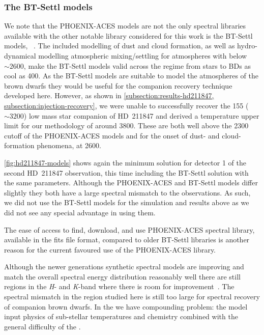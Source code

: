 \subsubsection{The {BT-Settl} models}
\label{subsubsec:bt-settl}
We note that the {PHOENIX-ACES} models are not the only spectral libraries available with the other notable library considered for this work is the {BT-Settl} models, ~\citep{allard_model_2010,allard_btsettl_2013,baraffe_new_2015}.
The included modelling of dust and cloud formation, as well as hydro-dynamical modelling atmospheric mixing/settling for atmospheres with \Teff{} below \(\sim2600\)\K{}, make the {BT-Settl} models valid across the regime from stars to {BD}s as cool as 400\K{}.
As the {BT-Settl} models are suitable to model the atmospheres of the brown dwarfs they would be useful for the companion recovery technique developed here.
However, as shown in \cref{subsection:results-hd211847, subsection:injection-recovery}, we were unable to successfully recover the 155\Mjup{} (\Teff{}\(\sim3200\)\K{}) low mass star companion of {HD~211847} and derived a temperature upper limit for our methodology of around 3800\K{}.
These are both well above the 2300\K{} cutoff of the {PHOENIX-ACES} models and for the onset of dust- and cloud-formation phenomena, at 2600\K{}.

\cref{fig:hd211847-models} shows again the minimum \textchisquared{} solution for detector 1 of the second {HD~211847} observation, this time including the {BT-Settl} solution with the same parameters.
Although the {PHOENIX-ACES} and {BT-Settl} models differ slightly they both have a large spectral mismatch to the observations.
As such, we did not use the {BT-Settl} models for the simulation and results above as we did not see any special advantage in using them.

The ease of access to find, download, and use {PHOENIX-ACES} spectral library, available in the fits file format, compared to older {BT-Settl} libraries is another reason for the current favoured use of the {PHOENIX-ACES} library.

Although the newer generations synthetic spectral models are improving and match the overall spectral energy distribution reasonably well there are still regions in the \emph{H}- and \emph{K}-band where there is room for improvement~\citet{rajpurohit_spectral_2016}.
The spectral mismatch in the region studied here is still too large for spectral recovery of companion brown dwarfs.
In the \nir{} we have compounding problem: the model input physics of sub-stellar temperatures and chemistry combined with the general difficulty of the \nir{}.


